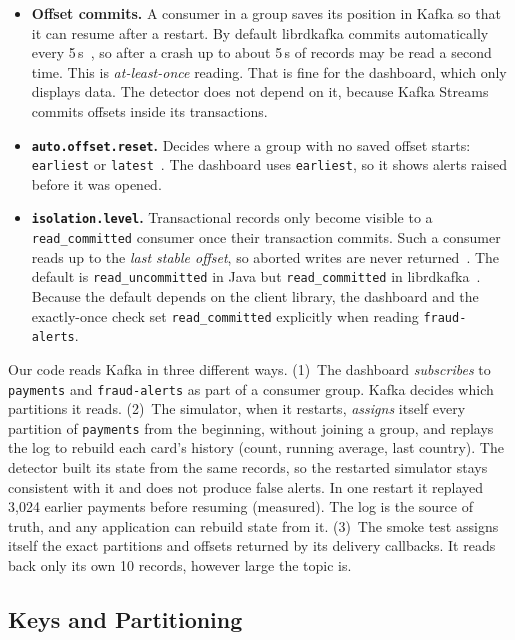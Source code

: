 \begin{itemize}
  \item \textbf{Offset commits.} A consumer in a group saves its position in Kafka so that it can resume after a restart. By default librdkafka commits automatically every 5\,s~\cite{librdkafka-config}, so after a crash up to about 5\,s of records may be read a second time. This is \emph{at-least-once} reading. That is fine for the dashboard, which only displays data. The detector does not depend on it, because Kafka Streams commits offsets inside its transactions.
  \item \textbf{\texttt{auto.offset.reset}.} Decides where a group with no saved offset starts: \texttt{earliest} or \texttt{latest}~\cite{kafka-consumer-configs}. The dashboard uses \texttt{earliest}, so it shows alerts raised before it was opened.
  \item \textbf{\texttt{isolation.level}.} Transactional records only become visible to a \texttt{read\_committed} consumer once their transaction commits. Such a consumer reads up to the \emph{last stable offset}, so aborted writes are never returned~\cite{kafka-consumer-configs}. The default is \texttt{read\_uncommitted} in Java but \texttt{read\_committed} in librdkafka~\cite{kafka-consumer-configs, librdkafka-config}. Because the default depends on the client library, the dashboard and the exactly-once check set \texttt{read\_committed} explicitly when reading \texttt{fraud-alerts}.
\end{itemize}

Our code reads Kafka in three different ways. (1)~The dashboard \emph{subscribes} to \texttt{payments} and \texttt{fraud-alerts} as part of a consumer group. Kafka decides which partitions it reads. (2)~The simulator, when it restarts, \emph{assigns} itself every partition of \texttt{payments} from the beginning, without joining a group, and replays the log to rebuild each card's history (count, running average, last country). The detector built its state from the same records, so the restarted simulator stays consistent with it and does not produce false alerts. In one restart it replayed 3{,}024 earlier payments before resuming (measured). The log is the source of truth, and any application can rebuild state from it. (3)~The smoke test assigns itself the exact partitions and offsets returned by its delivery callbacks. It reads back only its own 10 records, however large the topic is.

\subsection{Keys and Partitioning}
\label{sec:keys}


